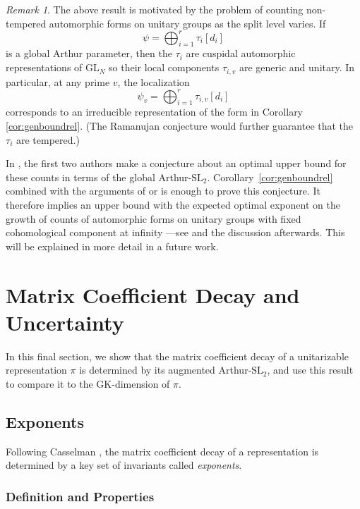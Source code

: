 \documentclass{amsart}
\newcommand{\SL}{\mathrm{SL}}
\newcommand{\GL}{\mathrm{GL}}
\newcommand{\1}{\m 1}
\theoremstyle{remark}
\newtheorem{rmk}[thm]{Remark}
\theoremstyle{definition}
\numberwithin{equation}{subsection}
\begin{document}
\begin{rmk}
The above result is motivated by the problem of counting non-tempered automorphic forms on unitary groups as the split level varies. If 
\[
\psi = \bigoplus_{i=1}^r \tau_i[d_i]
\]
is a global Arthur parameter, then the $\tau_i$ are cuspidal automorphic representations of $\GL_N$ so their local components $\tau_{i,v}$ are generic and unitary. In particular, at any prime $v$, the localization
\[
\psi_v = \bigoplus_{i=1}^r \tau_{i,v}[d_i]
\]
corresponds to an irreducible representation of the form in Corollary \ref{cor:genboundrel}. (The Ramanujan conjecture would further guarantee that the $\tau_i$ are tempered.) 

In \cite[Conj 9.6.3]{DGG22}, the first two authors make a conjecture about an optimal upper bound for these counts in terms of the global Arthur-$\SL_2$. Corollary~\ref{cor:genboundrel} combined with the arguments of \cite{DGG22} or \cite{MS19} is enough to prove this conjecture. It therefore implies an upper bound with the expected optimal exponent on the growth of counts of automorphic forms on unitary groups with fixed cohomological component at infinity%
---see \cite[Thm 11.4.2]{DGG22} and the discussion afterwards. This will be explained in more detail in a future work. 
\end{rmk}


\section{Matrix Coefficient Decay and Uncertainty}\label{sec:uncertainty}

In this final section, we show that the matrix coefficient decay of a unitarizable representation $\pi$ is determined by its augmented Arthur-$\SL_2$, and use this result to compare it to the GK-dimension of $\pi$.

\subsection{Exponents}
Following Casselman \cite{casselman1995introduction}, the matrix coefficient decay of a representation is determined by a key set of invariants called \emph{exponents}.

\subsubsection{Definition and Properties}
\end{document}
